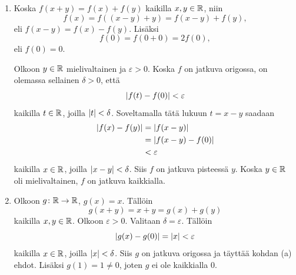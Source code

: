 \documentclass[11pt,a4paper]{amsart}
\begin{document}
\begin{solution}
  \leavevmode\par
  \begin{enumerate}[label=(\alph*), nosep]
    \item Koska \(f(x + y) = f(x) + f(y)\) kaikilla \(x,y \in \mathbb{R}\), niin
      \[
        f(x) = f((x - y) + y) = f(x - y) + f(y),
      \]
      eli \(f(x - y) = f(x) - f(y)\). Lisäksi
      \[
        f(0) = f(0 + 0) = 2f(0),
      \]
      eli \(f(0) = 0\).

      Olkoon \(y \in \mathbb{R}\) mielivaltainen ja \(\varepsilon > 0\). Koska
      \(f\) on jatkuva origossa, on olemassa sellainen \(\delta > 0\), että
      \[
        \lvert f(t) - f(0)\rvert < \varepsilon
      \]
      kaikilla \(t \in \mathbb{R}\), joilla \(\lvert t\rvert < \delta\).
      Soveltamalla tätä lukuun \(t = x - y\) saadaan
      \[
        \begin{aligned}
          \lvert f(x) - f(y)\rvert &= \lvert f(x - y)\rvert \\
          &= \lvert f(x - y) - f(0)\rvert \\
          &< \varepsilon
        \end{aligned}
      \]
      kaikilla \(x \in \mathbb{R}\), joilla \(\lvert x - y\rvert < \delta\).
      Siis \(f\) on jatkuva pisteessä \(y\). Koska \(y \in \mathbb{R}\) oli
      mielivaltainen, \(f\) on jatkuva kaikkialla.
    \item Olkoon \(g \colon \mathbb{R} \to \mathbb{R}\), \(g(x) = x\). Tällöin
      \[
        g(x + y) = x + y = g(x) + g(y)
      \]
      kaikilla \(x,y \in \mathbb{R}\). Olkoon \(\varepsilon > 0\).
      Valitaan \(\delta = \varepsilon\). Tällöin
      \[
        \lvert g(x) - g(0)\rvert = \lvert x\rvert < \varepsilon
      \]
      kaikilla \(x \in \mathbb{R}\), joilla \(\lvert x\rvert < \delta\). Siis \(g\) on
      jatkuva origossa ja täyttää kohdan (a) ehdot. Lisäksi
      \(g(1) = 1 \neq 0\), joten \(g\) ei ole kaikkialla \(0\).
  \end{enumerate}
\end{solution}
\end{document}
